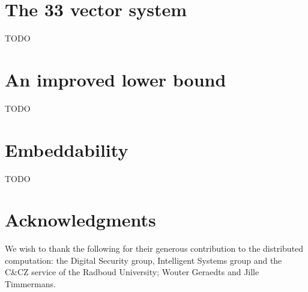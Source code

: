 \documentclass[a4paper]{article}
\newcounter{main}
\theoremstyle{definition}
\theoremstyle{remark}
\begin{document}
\section{The 33 vector system}
TODO

\section{An improved lower bound}
TODO

\section{Embeddability}
TODO

\section{Acknowledgments}
We wish to thank the following for their generous contribution to the
distributed computation:
    the Digital Security group, Intelligent Systems group
    and the C\&CZ service of the Radboud University;
    Wouter Geraedts and
    Jille Timmermans.

{}

\end{document}
